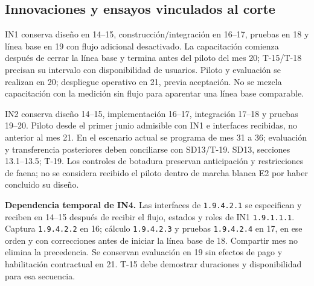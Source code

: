 \subsection{Innovaciones y ensayos vinculados al corte}
IN1 conserva diseño en 14--15, construcción/integración en 16--17, pruebas en 18 y línea base en 19 con flujo adicional desactivado. La capacitación comienza después de cerrar la línea base y termina antes del piloto del mes 20; T-15/T-18 precisan su intervalo con disponibilidad de usuarios. Piloto y evaluación se realizan en 20; despliegue operativo en 21, previa aceptación. No se mezcla capacitación con la medición sin flujo para aparentar una línea base comparable.

IN2 conserva diseño 14--15, implementación 16--17, integración 17--18 y pruebas 19--20. Piloto desde el primer junio admisible con IN1 e interfaces recibidas, no anterior al mes 21. En el escenario actual se programa de mes 31 a 36; evaluación y transferencia posteriores deben conciliarse con SD13/T-19. SD13, secciones 13.1--13.5; T-19. Los controles de botadura preservan anticipación y restricciones de faena; no se considera recibido el piloto dentro de marcha blanca E2 por haber concluido su diseño.

\textbf{Dependencia temporal de IN4.} Las interfaces de \texttt{1.9.4.2.1} se especifican y reciben en 14--15 después de recibir el flujo, estados y roles de IN1 \texttt{1.9.1.1.1}. Captura \texttt{1.9.4.2.2} en 16; cálculo \texttt{1.9.4.2.3} y pruebas \texttt{1.9.4.2.4} en 17, en ese orden y con correcciones antes de iniciar la línea base de 18. Compartir mes no elimina la precedencia. Se conservan evaluación en 19 sin efectos de pago y habilitación contractual en 21. T-15 debe demostrar duraciones y disponibilidad para esa secuencia.

